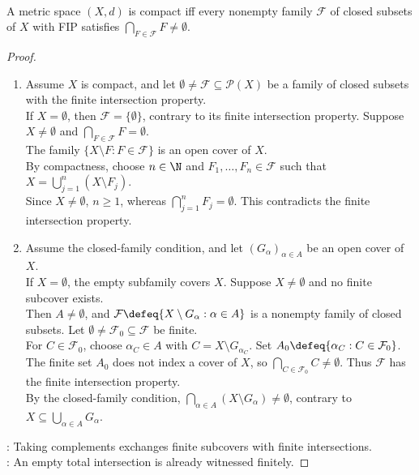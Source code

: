 \begin{proposition} \label{prop:compactness-closed-fip-characterization} \\
A metric space $(X,d)$ is compact iff every nonempty family $\mathcal{F}$ of closed subsets of $X$ with FIP satisfies $\bigcap\limits_{F\in\mathcal{F}}F\ne\emptyset$.
\begin{proof}
\begin{enumerate}[label=\roman*.]
\setlength{\itemsep}{0pt}
\item[$(\Rightarrow)$] Assume $X$ is compact, and let $\emptyset\ne\mathcal{F}\subseteq\mathcal{P}(X)$ be a family of closed subsets with the finite intersection property.\\
If $X=\emptyset$, then $\mathcal{F}=\{\emptyset\}$, contrary to its finite intersection property. Suppose $X\ne\emptyset$ and $\bigcap\limits_{F\in\mathcal{F}}F=\emptyset$.\\
The family $\{X\setminus F:F\in\mathcal{F}\}$ is an open cover of $X$.\\
By compactness, choose $n\in\N$ and $F_1,\ldots,F_n\in\mathcal{F}$ such that $X=\bigcup\limits_{j=1}^{n}(X\setminus F_j)$.\\
Since $X\ne\emptyset$, $n\geq1$, whereas $\bigcap\limits_{j=1}^{n}F_j=\emptyset$. This contradicts the finite intersection property.
\item[$(\Leftarrow)$] Assume the closed-family condition, and let $(G_\alpha)_{\alpha\in A}$ be an open cover of $X$.\\
If $X=\emptyset$, the empty subfamily covers $X$. Suppose $X\ne\emptyset$ and no finite subcover exists.\\
Then $A\ne\emptyset$, and $\mathcal{F}\defeq\{X\setminus G_\alpha:\alpha\in A\}$ is a nonempty family of closed subsets. Let $\emptyset\ne\mathcal{F}_0\subseteq\mathcal{F}$ be finite.\\
For $C\in\mathcal{F}_0$, choose $\alpha_C\in A$ with $C=X\setminus G_{\alpha_C}$. Set $A_0\defeq\{\alpha_C:C\in\mathcal{F}_0\}$.\\
The finite set $A_0$ does not index a cover of $X$, so $\bigcap\limits_{C\in\mathcal{F}_0}C\ne\emptyset$. Thus $\mathcal{F}$ has the finite intersection property.\\
By the closed-family condition, $\bigcap\limits_{\alpha\in A}(X\setminus G_\alpha)\ne\emptyset$, contrary to $X\subseteq\bigcup\limits_{\alpha\in A}G_\alpha$.
\end{enumerate}
: Taking complements exchanges finite subcovers with finite intersections.\\
: An empty total intersection is already witnessed finitely.
\end{proof}
\end{proposition}

